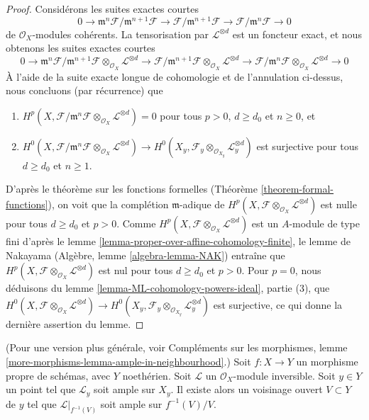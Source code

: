 \begin{proof}
\medskip\noindent
Considérons les suites exactes courtes
$$
0 \to \mathfrak m^n\mathcal{F}/\mathfrak m^{n + 1} \mathcal{F}
\to \mathcal{F}/\mathfrak m^{n + 1} \mathcal{F}
\to \mathcal{F}/\mathfrak m^n \mathcal{F} \to 0
$$
de $\mathcal{O}_X$-modules cohérents. La tensorisation par $\mathcal{L}^{\otimes d}$
est un foncteur exact, et nous obtenons les suites exactes courtes
$$
0 \to
\mathfrak m^n\mathcal{F}/\mathfrak m^{n + 1} \mathcal{F}
\otimes_{\mathcal{O}_X} \mathcal{L}^{\otimes d}
\to \mathcal{F}/\mathfrak m^{n + 1} \mathcal{F}
\otimes_{\mathcal{O}_X} \mathcal{L}^{\otimes d}
\to \mathcal{F}/\mathfrak m^n \mathcal{F}
\otimes_{\mathcal{O}_X} \mathcal{L}^{\otimes d} \to 0
$$
À l'aide de la suite exacte longue de cohomologie et de l'annulation
ci-dessus, nous concluons (par récurrence) que
\begin{enumerate}
\item $H^p(X, \mathcal{F}/\mathfrak m^n \mathcal{F}
\otimes_{\mathcal{O}_X} \mathcal{L}^{\otimes d}) = 0$
pour tous $p > 0$, $d \geq d_0$ et $n \geq 0$, et
\item $H^0(X, \mathcal{F}/\mathfrak m^n \mathcal{F}
\otimes_{\mathcal{O}_X} \mathcal{L}^{\otimes d}) \to
H^0(X_y, \mathcal{F}_y \otimes_{\mathcal{O}_{X_y}} \mathcal{L}_y^{\otimes d})$
est surjective pour tous $d \geq d_0$ et $n \geq 1$.
\end{enumerate}
D'après le théorème sur les fonctions formelles (Théorème \ref{theorem-formal-functions}),
on voit que la complétion $\mathfrak m$-adique de
$H^p(X, \mathcal{F} \otimes_{\mathcal{O}_X} \mathcal{L}^{\otimes d})$
est nulle pour tous $d \geq d_0$ et $p > 0$.
Comme $H^p(X, \mathcal{F} \otimes_{\mathcal{O}_X} \mathcal{L}^{\otimes d})$
est un $A$-module de type fini d'après
le lemme \ref{lemma-proper-over-affine-cohomology-finite},
le lemme de Nakayama (Algèbre, lemme \ref{algebra-lemma-NAK}) entraîne
que $H^p(X, \mathcal{F} \otimes_{\mathcal{O}_X} \mathcal{L}^{\otimes d})$
est nul pour tous $d \geq d_0$ et $p > 0$.
Pour $p = 0$, nous déduisons du
lemme \ref{lemma-ML-cohomology-powers-ideal}, partie (3),
que $H^0(X, \mathcal{F} \otimes_{\mathcal{O}_X} \mathcal{L}^{\otimes d}) \to
H^0(X_y, \mathcal{F}_y \otimes_{\mathcal{O}_{X_y}} \mathcal{L}_y^{\otimes d})$
est surjective, ce qui donne la dernière assertion du lemme.
\end{proof}

\begin{lemma}
\label{lemma-ample-in-neighbourhood}
(Pour une version plus générale, voir Compléments
sur les morphismes,
lemme \ref{more-morphisms-lemma-ample-in-neighbourhood}.)
Soit $f : X \to Y$ un morphisme propre de schémas, avec $Y$ noethérien.
Soit $\mathcal{L}$ un $\mathcal{O}_X$-module inversible.
Soit $y \in Y$ un point tel que $\mathcal{L}_y$ soit ample
sur $X_y$. Il existe alors un voisinage ouvert $V \subset Y$
de $y$ tel que $\mathcal{L}|_{f^{-1}(V)}$ soit ample sur $f^{-1}(V)/V$.
\end{lemma}

